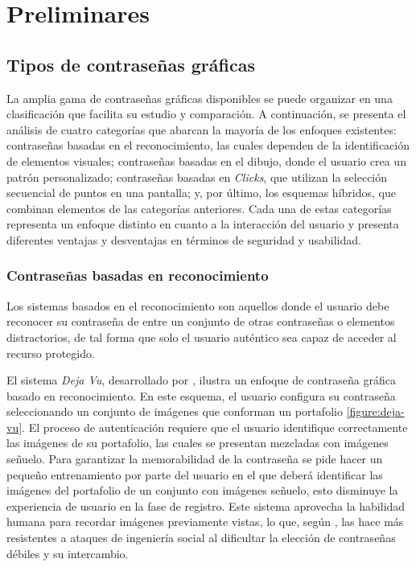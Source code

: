 \chapter{Preliminares}\label{chapter:state-of-the-art}
\section{Tipos de contraseñas gráficas}
La amplia gama de contraseñas gráficas disponibles se puede organizar en una clasificación que facilita su estudio y comparación. A continuación, se presenta el análisis de cuatro categorías que abarcan la mayoría de los enfoques existentes: contraseñas basadas en el reconocimiento, las cuales dependen de la identificación de elementos visuales; contraseñas basadas en el dibujo, donde el usuario crea un patrón personalizado; contraseñas basadas en \textit{Clicks}, que utilizan la selección secuencial de puntos en una pantalla; y, por último, los esquemas híbridos, que combinan elementos de las categorías anteriores. Cada una de estas categorías representa un enfoque distinto en cuanto a la interacción del usuario y presenta diferentes ventajas y desventajas en términos de seguridad y usabilidad.  
\subsection{Contraseñas basadas en reconocimiento}
Los sistemas basados en el reconocimiento son aquellos donde el usuario debe reconocer su contraseña de entre un conjunto de otras contraseñas o elementos distractorios, de tal forma que solo el usuario auténtico sea capaz de acceder al recurso protegido.

 
El sistema \textit{Deja Vu}, desarrollado por \cite{dhamija2000deja}, ilustra un enfoque de contraseña gráfica basado en reconocimiento. En este esquema, el usuario configura su contraseña seleccionando un conjunto de imágenes que conforman un portafolio \ref{figure:deja-vu}. El proceso de autenticación requiere que el usuario identifique correctamente las imágenes de su portafolio, las cuales se presentan mezcladas con imágenes señuelo. Para garantizar la memorabilidad de la contraseña se pide hacer un pequeño entrenamiento por parte del usuario en el que deberá identificar las imágenes del portafolio de un conjunto con imágenes señuelo, esto disminuye la experiencia de usuario en la fase de registro. Este sistema aprovecha la habilidad humana para recordar imágenes previamente vistas, lo que, según \cite{dhamija2000deja}, las hace más resistentes a ataques de ingeniería social al dificultar la elección de contraseñas débiles y su intercambio.


